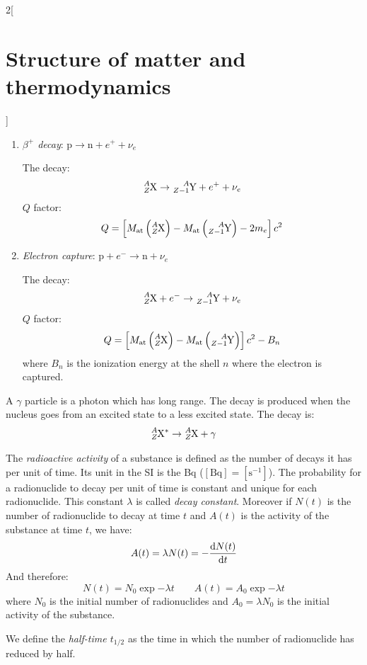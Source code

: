 \documentclass[../../../main.tex]{subfiles}
\begin{document}
\begin{multicols}{2}[\section{Structure of matter and thermodynamics}]
\begin{definition}
\begin{enumerate}
            \item \textit{$\beta^+$ decay}: $\text{p}\rightarrow\text{n}+e^++\nu_e$\par
                  The decay: $$\ce{^$A$_$Z$X}\rightarrow\ce{^$A$_$Z-1$Y}+e^++\nu_e$$
                  $Q$ factor: $$Q=\left[M_\text{at}\left(\ce{^$A$_$Z$X}\right)-M_\text{at}\left(\ce{^$A$_$Z-1$Y}\right)-2m_e\right]c^2$$
            \item \textit{Electron capture}: $\text{p}+e^-\rightarrow\text{n}+\nu_e$\par
                  The decay: $$\ce{^$A$_$Z$X}+e^-\rightarrow\ce{^$A$_$Z-1$Y}+\nu_e$$
                  $Q$ factor: $$Q=\left[M_\text{at}\left(\ce{^$A$_$Z$X}\right)-M_\text{at}\left(\ce{^$A$_$Z-1$Y}\right)\right]c^2-B_n$$
                  where $B_n$ is the ionization energy at the shell $n$ where the electron is captured.
        \end{enumerate}
    \end{definition}
    \begin{definition}
        A $\gamma$ particle is a photon which has long range. The decay is produced when the nucleus goes from an excited state to a less excited state. The decay is: $$\ce{^$A$_$Z$X}^*\rightarrow\ce{^$A$_$Z$X}+\gamma$$
    \end{definition}
    \begin{definition}
        The \textit{radioactive activity} of a substance is defined as the number of decays it has per unit of time. Its unit in the SI is the Bq ($[\text{Bq}]=[\text{s}^{-1}]$). The probability for a radionuclide to decay per unit of time is constant and unique for each radionuclide. This constant $\lambda$ is called \textit{decay constant}. Moreover if $N(t)$ is the number of radionuclide to decay at time $t$ and $A(t)$ is the activity of the substance at time $t$, we have:
        $$A(t)=\lambda N(t)=-\dv{N(t)}{t}$$ And therefore:
        $$N(t)=N_0\exp{-\lambda t}\qquad A(t)=A_0\exp{-\lambda t}$$
        where $N_0$ is the initial number of radionuclides and $A_0=\lambda N_0$ is the initial activity of the substance.
    \end{definition}
    \begin{definition}
        We define the \textit{half-time $t_{1/2}$} as the time in which the number of radionuclide has reduced by half.
    \end{definition}

\end{multicols}
\end{document}
